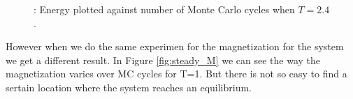 \documentclass{article}
\begin{document}
{		\begin{figure}[H]
		\caption{: Energy plotted against number of Monte Carlo cycles when $T = 2.4$. }
		\label{fig:steady_E_highT}
		\end{figure}

		However when we do the same experimen for the magnetization for the system we get a different result. In Figure \ref{fig:steady_M} we can see the way the magnetization varies over MC cycles for T=1. But there is not so easy to find a sertain location where the system reaches an equilibrium.

}
\end{document}
